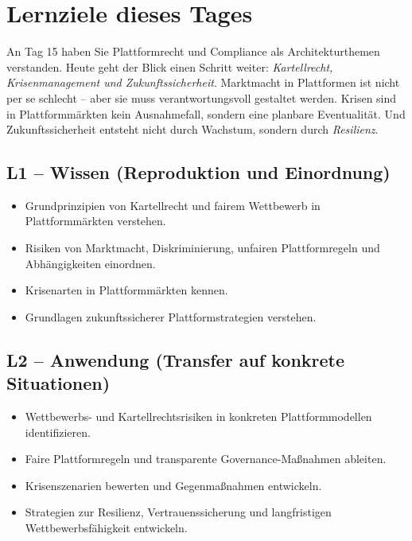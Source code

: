 \documentclass[11pt,a4paper,oneside]{article}
\begin{document}
\section*{Lernziele dieses Tages}
\thispagestyle{plain}

\noindent An Tag 15 haben Sie Plattformrecht und Compliance als Architekturthemen verstanden. Heute geht der Blick einen Schritt weiter: \emph{Kartellrecht, Krisenmanagement und Zukunftssicherheit}. Marktmacht in Plattformen ist nicht per se schlecht -- aber sie muss verantwortungsvoll gestaltet werden. Krisen sind in Plattformmärkten kein Ausnahmefall, sondern eine planbare Eventualität. Und Zukunftssicherheit entsteht nicht durch Wachstum, sondern durch \emph{Resilienz}.

\subsection*{L1 -- Wissen (Reproduktion und Einordnung)}
\begin{itemize}
  \item Grundprinzipien von Kartellrecht und fairem Wettbewerb in Plattformmärkten verstehen.
  \item Risiken von Marktmacht, Diskriminierung, unfairen Plattformregeln und Abhängigkeiten einordnen.
  \item Krisenarten in Plattformmärkten kennen.
  \item Grundlagen zukunftssicherer Plattformstrategien verstehen.
\end{itemize}

\subsection*{L2 -- Anwendung (Transfer auf konkrete Situationen)}
\begin{itemize}
  \item Wettbewerbs- und Kartellrechtsrisiken in konkreten Plattformmodellen identifizieren.
  \item Faire Plattformregeln und transparente Governance-Maßnahmen ableiten.
  \item Krisenszenarien bewerten und Gegenmaßnahmen entwickeln.
  \item Strategien zur Resilienz, Vertrauenssicherung und langfristigen Wettbewerbsfähigkeit entwickeln.
\end{itemize}
\end{document}
